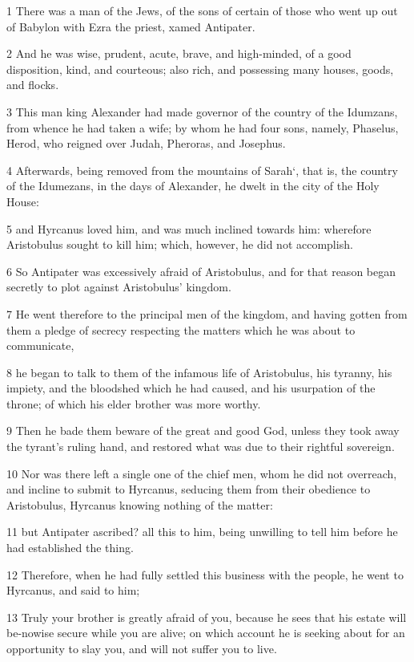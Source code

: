 1 There was a man of the Jews, of the sons of certain of those who went up out of Babylon with Ezra the priest, xamed Antipater. 

2 And he was wise, prudent, acute, brave, and high-minded, of a good disposition, kind, and courteous; also rich, and possessing many houses, goods, and flocks. 

3 This man king Alexander had made governor of the country of the Idumzans, from whence he had taken a wife; by whom he had four sons, namely, Phaselus, Herod, who reigned over Judah, Pheroras, and Josephus. 

4 Afterwards, being removed from the mountains of Sarah‘, that is, the country of the Idumezans, in the days of Alexander, he dwelt in the city of the Holy House: 

5 and Hyrcanus loved him, and was much inclined towards him: wherefore Aristobulus sought to kill him; which, however, he did not accomplish. 

6 So Antipater was excessively afraid of Aristobulus, and for that reason began secretly to plot against Aristobulus’ kingdom. 

7 He went therefore to the principal men of the kingdom, and having gotten from them a pledge of secrecy respecting the matters which he was about to communicate, 

8 he began to talk to them of the infamous life of Aristobulus, his tyranny, his impiety, and the bloodshed which he had caused, and his usurpation of the throne; of which his elder brother was more worthy. 

9 Then he bade them beware of the great and good God, unless they took away the tyrant’s ruling hand, and restored what was due to their rightful sovereign. 

10 Nor was there left a single one of the chief men, whom he did not overreach, and incline to submit to Hyrcanus, seducing them from their obedience to Aristobulus, Hyrcanus knowing nothing of the matter: 

11 but Antipater ascribed? all this to him, being unwilling to tell him before he had established the thing. 

12 Therefore, when he had fully settled this business with the people, he went to Hyrcanus, and said to him; 

13 Truly your brother is greatly afraid of you, because he sees that his estate will be-nowise secure while you are alive; on which account he is seeking about for an opportunity to slay you, and will not suffer you to live. 

